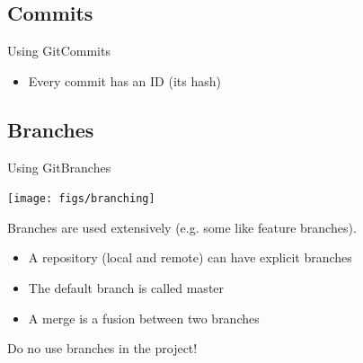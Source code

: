 \documentclass[10pt,compress]{beamer} %
\begin{document}





\subsection{Commits}
\begin{frame}{Using Git}{Commits}

\begin{itemize}
\item Every commit has an ID (its hash)
\end{itemize}

\end{frame}

\subsection{Branches}
\begin{frame}{Using Git}{Branches}

\centering \texttt{[image: figs/branching]}

\flushleft Branches are used extensively (e.g. some like feature branches).

\begin{itemize}
 \item A repository (local and remote) can have explicit branches
 \item The default branch is called \alert{master}
 \item A \alert{merge} is a fusion between two branches
\end{itemize}

Do no use branches in the project!

\end{frame}
\end{document}
